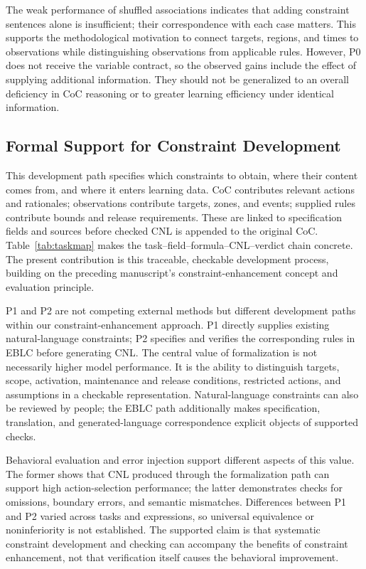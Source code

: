\documentclass[nolineno]{ieeeaccess}
\begin{document}
The weak performance of shuffled associations indicates that adding constraint sentences alone is insufficient; their correspondence with each case matters. This supports the methodological motivation to connect targets, regions, and times to observations while distinguishing observations from applicable rules. However, P0 does not receive the variable contract, so the observed gains include the effect of supplying additional information. They should not be generalized to an overall deficiency in CoC reasoning or to greater learning efficiency under identical information.\par

\subsection{Formal Support for Constraint Development}

This development path specifies which constraints to obtain, where their content comes from, and where it enters learning data. CoC contributes relevant actions and rationales; observations contribute targets, zones, and events; supplied rules contribute bounds and release requirements. These are linked to specification fields and sources before checked CNL is appended to the original CoC. Table~\ref{tab:taskmap} makes the task--field--formula--CNL--verdict chain concrete. The present contribution is this traceable, checkable development process, building on the preceding manuscript's constraint-enhancement concept and evaluation principle.\par

P1 and P2 are not competing external methods but different development paths within our constraint-enhancement approach. P1 directly supplies existing natural-language constraints; P2 specifies and verifies the corresponding rules in EBLC before generating CNL. The central value of formalization is not necessarily higher model performance. It is the ability to distinguish targets, scope, activation, maintenance and release conditions, restricted actions, and assumptions in a checkable representation. Natural-language constraints can also be reviewed by people; the EBLC path additionally makes specification, translation, and generated-language correspondence explicit objects of supported checks.\par

Behavioral evaluation and error injection support different aspects of this value. The former shows that CNL produced through the formalization path can support high action-selection performance; the latter demonstrates checks for omissions, boundary errors, and semantic mismatches. Differences between P1 and P2 varied across tasks and expressions, so universal equivalence or noninferiority is not established. The supported claim is that systematic constraint development and checking can accompany the benefits of constraint enhancement, not that verification itself causes the behavioral improvement.\par
\end{document}
